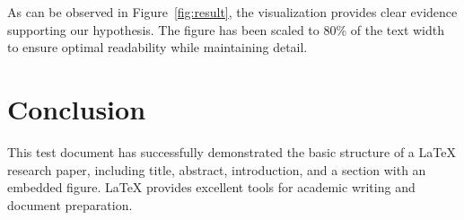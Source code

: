 \documentclass[12pt,a4paper]{article}
\begin{document}
As can be observed in Figure~\ref{fig:result}, the visualization provides clear evidence supporting our hypothesis. The figure has been scaled to 80\% of the text width to ensure optimal readability while maintaining detail.

\section{Conclusion}

This test document has successfully demonstrated the basic structure of a LaTeX research paper, including title, abstract, introduction, and a section with an embedded figure. LaTeX provides excellent tools for academic writing and document preparation.
\end{document}
